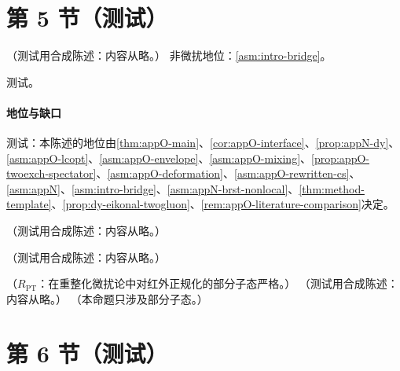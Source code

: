 \section{第 5 节（测试）}\label{sec:dy-model}

\begin{theorem}\label{thm:dy-factorization}
（测试用合成陈述：内容从略。）
非微扰地位：\cref{asm:intro-bridge}。
\end{theorem}
\begin{proofsketch}测试。\end{proofsketch}
\paragraph{地位与缺口}测试：本陈述的地位由\cref{thm:appO-main}、\cref{cor:appO-interface}、\cref{prop:appN-dy}、\cref{asm:appO-lcopt}、\cref{asm:appO-envelope}、\cref{asm:appO-mixing}、\cref{prop:appO-twoexch-spectator}、\cref{asm:appO-deformation}、\cref{asm:appO-rewritten-cs}、\cref{asm:appN}、\cref{asm:intro-bridge}、\cref{asm:appN-brst-nonlocal}、\cref{thm:method-template}、\cref{prop:dy-eikonal-twogluon}、\cref{rem:appO-literature-comparison}决定。

\begin{remark}\label{rem:dy-nnlo-not-glauber}
（测试用合成陈述：内容从略。）
\end{remark}

\begin{remark}\label{rem:dy-dft-premises}
（测试用合成陈述：内容从略。）
\end{remark}

\begin{proposition}\label{prop:dy-nlo}
（$R_{\mathrm{PT}}$：在重整化微扰论中对红外正规化的部分子态严格。）
（测试用合成陈述：内容从略。）
（本命题只涉及部分子态。）
\end{proposition}

\section{第 6 节（测试）}\label{sec:dy-theorem}

